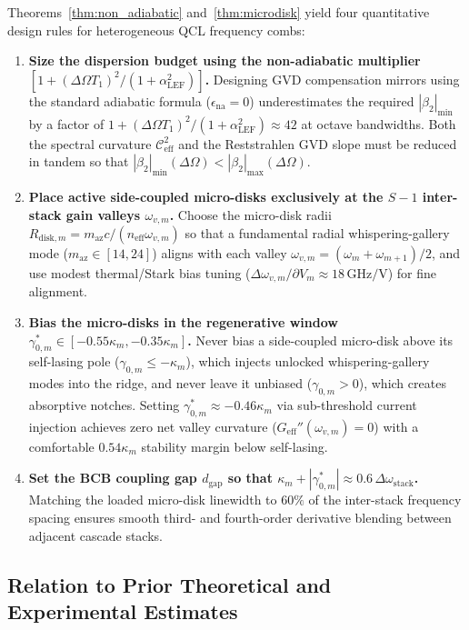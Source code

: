 \documentclass[11pt,letterpaper]{article}
\begin{document}
Theorems~\ref{thm:non_adiabatic} and~\ref{thm:microdisk} yield four quantitative design rules for heterogeneous QCL frequency combs:
\begin{enumerate}
    \item \textbf{Size the dispersion budget using the non-adiabatic multiplier $[1 + (\Delta\Omega T_1)^2/(1 + \alpha_{\mathrm{LEF}}^2)]$.} Designing GVD compensation mirrors using the standard adiabatic formula ($\epsilon_{\mathrm{na}} = 0$) underestimates the required $|\beta_2|_{\min}$ by a factor of $1 + (\Delta\Omega T_1)^2/(1 + \alpha_{\mathrm{LEF}}^2) \approx 42$ at octave bandwidths. Both the spectral curvature $\mathcal{C}_{\mathrm{eff}}^2$ and the Reststrahlen GVD slope must be reduced in tandem so that $|\beta_2|_{\min}(\Delta\Omega) < |\beta_2|_{\max}(\Delta\Omega)$.
    \item \textbf{Place active side-coupled micro-disks exclusively at the $S - 1$ inter-stack gain valleys $\omega_{v,m}$.} Choose the micro-disk radii $R_{\mathrm{disk},m} = m_{\mathrm{az}} c / (n_{\mathrm{eff}}\omega_{v,m})$ so that a fundamental radial whispering-gallery mode ($m_{\mathrm{az}} \in [14, 24]$) aligns with each valley $\omega_{v,m} = (\omega_m + \omega_{m+1})/2$, and use modest thermal/Stark bias tuning ($\Delta\omega_{v,m}/\partial V_m \approx 18\,\mathrm{GHz/V}$) for fine alignment.
    \item \textbf{Bias the micro-disks in the regenerative window $\gamma_{0,m}^* \in [-0.55\kappa_m, -0.35\kappa_m]$.} Never bias a side-coupled micro-disk above its self-lasing pole ($\gamma_{0,m} \le -\kappa_m$), which injects unlocked whispering-gallery modes into the ridge, and never leave it unbiased ($\gamma_{0,m} > 0$), which creates absorptive notches. Setting $\gamma_{0,m}^* \approx -0.46\kappa_m$ via sub-threshold current injection achieves zero net valley curvature ($G_{\mathrm{eff}}''(\omega_{v,m}) = 0$) with a comfortable $0.54\kappa_m$ stability margin below self-lasing.
    \item \textbf{Set the BCB coupling gap $d_{\mathrm{gap}}$ so that $\kappa_m + |\gamma_{0,m}^*| \approx 0.6\,\Delta\omega_{\mathrm{stack}}$.} Matching the loaded micro-disk linewidth to $60\%$ of the inter-stack frequency spacing ensures smooth third- and fourth-order derivative blending between adjacent cascade stacks.
\end{enumerate}

\subsection{Relation to Prior Theoretical and Experimental Estimates}
\label{subsec:prior_work}
\end{document}
